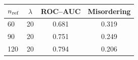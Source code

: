 \begin{tabular}{lccc}
\toprule
$n_{\rm ref}$ & $\lambda$ & ROC--AUC & Misordering \\
\midrule
60 & 20 & 0.681 & 0.319 \\
90 & 20 & 0.751 & 0.249 \\
120 & 20 & 0.794 & 0.206 \\
\bottomrule
\end{tabular}
